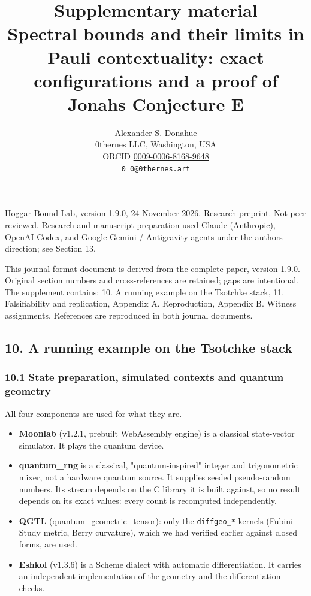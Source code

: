 \documentclass[11pt,a4paper]{article}
\title{Supplementary material\\[0.5em]\large Spectral bounds and their limits in Pauli contextuality: exact configurations and a proof of Jonah\textquotesingle s Conjecture E}
\author{Alexander S. Donahue\\0thernes LLC, Washington, USA\\ORCID \href{https://orcid.org/0009-0006-8168-9648}{0009-0006-8168-9648}\\\texttt{0\_0@0thernes.art}}
\date{}
\providecommand{\tightlist}{\setlength{\itemsep}{0pt}\setlength{\parskip}{0pt}}
\begin{document}
\maketitle

Hoggar Bound Lab, version 1.9.0, 24 November 2026. Research preprint. Not peer reviewed.
Research and manuscript preparation used Claude (Anthropic), OpenAI Codex, and Google Gemini / Antigravity agents under the author\textquotesingle s direction; see Section 13.

This journal-format document is derived from the complete paper, version 1.9.0. Original section numbers and cross-references are retained; gaps are intentional. The supplement contains: 10. A running example on the Tsotchke stack, 11. Falsifiability and replication, Appendix A. Reproduction, Appendix B. Witness assignments. References are reproduced in both journal documents.

\subsection{10. A running example on the Tsotchke stack}\label{10-a-running-example-on-the-tsotchke-stack}

\subsubsection{10.1 State preparation, simulated contexts and quantum geometry}\label{101-state-preparation-simulated-contexts-and-quantum-geometry}

All four components are used for what they are.

\begin{itemize}
\tightlist
\item
  \textbf{Moonlab} (v1.2.1, prebuilt WebAssembly engine) is a classical state-vector simulator. It plays
  the quantum device.
\item
  \textbf{quantum\_rng} is a classical, "quantum-inspired" integer and trigonometric mixer, not a hardware
  quantum source. It supplies seeded pseudo-random numbers. Its stream depends on the C library it is
  built against, so no result depends on its exact values: every count is recomputed independently.
\item
  \textbf{QGTL} (quantum\_geometric\_tensor): only the \texttt{diffgeo\_*} kernels (Fubini--Study metric, Berry
  curvature), which we had verified earlier against closed forms, are used.
\item
  \textbf{Eshkol} (v1.3.6) is a Scheme dialect with automatic differentiation. It carries an independent
  implementation of the geometry and the differentiation checks.
\end{itemize}
\end{document}
